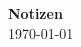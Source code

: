 \documentclass[11pt,paper=a4,fleqn,parskip=half%
]{scrartcl}
\newcommand{\titel}{Notizen}
\newcommand{\datum}{\today}
\newcommand{\datumHand}{09.07.2021}%
\begin{document}
    \begin{center}
        \textbf{\Large \titel}\\ %
        \vspace{0.4em}
        \datum
    \end{center}


	

\end{document}
